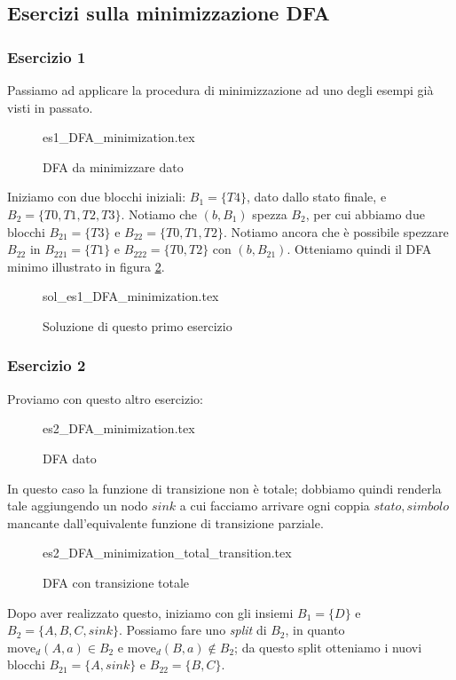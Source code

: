 \documentclass[class=book, crop=false, oneside, 12pt]{standalone}
\begin{document}
\subsection{Esercizi sulla minimizzazione DFA}
\subsubsection{Esercizio 1}
Passiamo ad applicare la procedura di minimizzazione ad uno degli esempi già visti in passato.

\begin{figure}[H]
	\centering
    {es1_DFA_minimization.tex}
	\caption{DFA da minimizzare dato}
	\label{mindfa-es-1}
\end{figure}

Iniziamo con due blocchi iniziali: \(B_{1}=\{T4\}\), dato dallo stato finale, e \(B_{2}=\{T0,T1,T2,T3\}\). Notiamo che \((b,B_{1})\) spezza \(B_{2}\), per cui abbiamo due blocchi \(B_{21}=\{T3\}\) e \(B_{22}=\{T0,T1,T2\}\). Notiamo ancora che è possibile spezzare \(B_{22}\) in \(B_{221}=\{T1\}\) e \(B_{222}=\{T0,T2\}\) con \((b,B_{21})\). Otteniamo quindi il DFA minimo illustrato in figura \ref{mindfa-es1-sol}. 

\begin{figure}[H]
	\centering
    {sol_es1_DFA_minimization.tex}
	\caption{Soluzione di questo primo esercizio}
  \label{mindfa-es1-sol}
\end{figure}

\subsubsection{Esercizio 2}
\label{subsec:dfa-minimization}
Proviamo con questo altro esercizio:
\begin{figure}[H]
	\centering
    {es2_DFA_minimization.tex}
	\caption{DFA dato}
  \label{mindfa-es-2}
\end{figure}
In questo caso la funzione di transizione non è totale; dobbiamo quindi renderla tale aggiungendo un nodo \(sink\) a cui facciamo arrivare ogni coppia \(stato, simbolo\) mancante dall'equivalente funzione di transizione parziale.
\begin{figure}[H]
	\centering
    {es2_DFA_minimization_total_transition.tex}
	\caption{DFA con transizione totale}
  \label{minndfa-es-2-tot}
\end{figure}
Dopo aver realizzato questo, iniziamo con gli insiemi \(B_{1}=\{D\}\) e \(B_{2}=\{A,B,C,sink\}\). Possiamo fare uno \emph{split} di \(B_{2}\), in quanto \(\textrm{move}_{d}(A,a) \in B_{2} \) e \(\textrm{move}_{d}(B,a) \notin B_{2} \); da questo split otteniamo i nuovi blocchi \(B_{21}=\{A,sink\}\) e \(B_{22}=\{B,C\}\).
\end{document}
